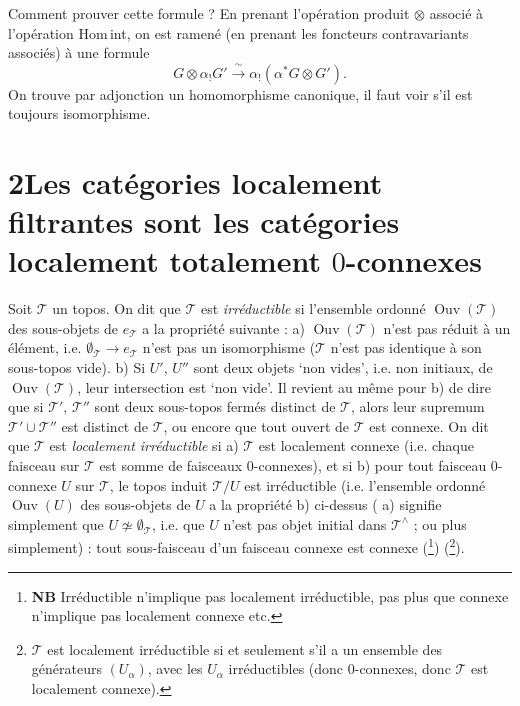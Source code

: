 \documentclass[11pt]{article}
\newcommand{\printedpage}[1]{\marginpar{\footnotesize p.~#1}}
\newcommand{\msp}[1]{\marginpar{\footnotesize [#1]}}
\begin{document}
Comment prouver cette formule ? En prenant l'opération produit $\otimes$ associé à l'opération Hom\,int, on est ramené (en prenant les foncteurs contravariants associés) à une formule
\[ G \otimes \alpha_!G' \xrightarrow{\ \sim\ } \alpha_!(\alpha^*G \otimes G'). \]
On trouve par adjonction un homomorphisme canonique, il faut voir s'il est toujours isomorphisme.

\printedpage{7}
\msp{page 11}

\section*{2\quad Les catégories localement filtrantes sont les catégories localement totalement $0$-connexes}

Soit $\mathcal{T}$ un topos. On dit que $\mathcal{T}$ est \textit{irréductible} si l'ensemble ordonné $\operatorname{Ouv}(\mathcal{T})$ des sous-objets de $e_{\mathcal{T}}$ a la propriété suivante : a) $\operatorname{Ouv}(\mathcal{T})$ n'est pas réduit à un élément, i.e. $\emptyset_{\mathcal{T}} \longrightarrow e_{\mathcal{T}}$ n'est pas un isomorphisme ($\mathcal{T}$ n'est pas identique à son sous-topos vide). b) Si $U'$, $U''$ sont deux objets `non vides', i.e. non initiaux, de $\operatorname{Ouv}(\mathcal{T})$, leur intersection est `non vide'. Il revient au même pour b) de dire que si $\mathcal{T}'$, $\mathcal{T}''$ sont deux sous-topos fermés distinct de $\mathcal{T}$, alors leur supremum $\mathcal{T}' \cup \mathcal{T}''$ est distinct de $\mathcal{T}$, ou encore que tout ouvert de $\mathcal{T}$ est connexe. On dit que $\mathcal{T}$ est \textit{localement irréductible} si a) $\mathcal{T}$ est localement connexe (i.e. chaque faisceau sur $\mathcal{T}$ est somme de faisceaux 0-connexes), et si b) pour tout faisceau 0-connexe $U$ sur $\mathcal{T}$, le topos induit $\mathcal{T}/U$ est irréductible (i.e. l'ensemble ordonné $\operatorname{Ouv}(U)$ des sous-objets de $U$ a la propriété b) ci-dessus ( a) signifie simplement que $U \not\simeq \emptyset_{\mathcal{T}}$, i.e. que $U$ n'est pas objet initial dans $\mathcal{T}^\wedge$ ; ou plus simplement) : tout sous-faisceau d'un faisceau connexe est connexe (\footnote[5]{\textbf{NB} Irréductible n'implique pas localement irréductible, pas plus que connexe n'implique pas localement connexe etc.}) (\footnote[6]{$\mathcal{T}$ est localement irréductible si et seulement s'il a un ensemble des générateurs $(U_\alpha)$, avec les $U_\alpha$ irréductibles (donc 0-connexes, donc $\mathcal{T}$ est localement connexe).}).
\end{document}
